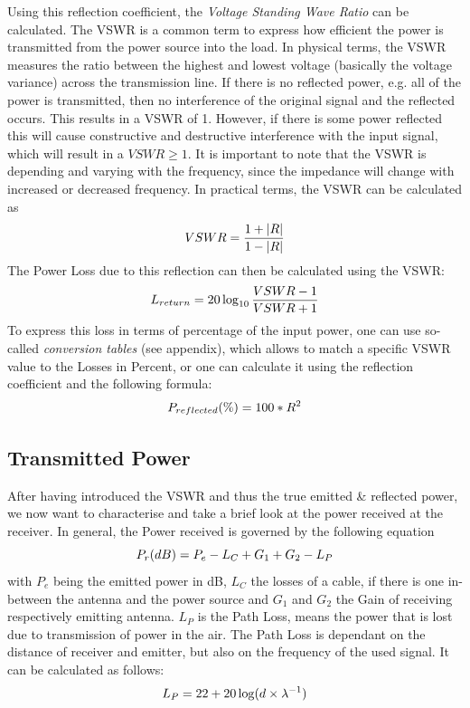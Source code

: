 Using this reflection coefficient, the \textit{Voltage Standing Wave Ratio} can be calculated. The VSWR is a common term to express how efficient the power is transmitted from the power source into the load. In physical terms, the VSWR measures the ratio between the highest and lowest voltage (basically the voltage variance) across the transmission line. If there is no reflected power, e.g. all of the power is transmitted, then no interference of the original signal and the reflected occurs. This results in a VSWR of 1. However, if there is some power reflected this will cause constructive and destructive interference with the input signal, which will result in a $VSWR \geq 1$. It is important to note that the VSWR is depending and varying with the frequency, since the impedance will change with increased or decreased frequency.
In practical terms, the VSWR can be calculated as
\begin{equation}
	\centering
	VSWR = \frac{1 + |R|}{1 - |R|}
\end{equation}
The Power Loss due to this reflection can then be calculated using the VSWR:
\begin{equation}
	\centering
	L_{return} = 20 \log_{10}{\frac{VSWR-1}{VSWR+1}}
\end{equation}
To express this loss in terms of percentage of the input power, one can use so-called \textit{conversion tables} (see appendix), which allows to match a specific VSWR value to the Losses in Percent, or one can calculate it using the reflection coefficient and the following formula:
\begin{equation}
	\centering
	P_{reflected} (\%) = 100 * R^2
\end{equation}

\subsection{Transmitted Power}
\label{subsec:power}
After having introduced the VSWR and thus the true emitted \& reflected power, we now want to characterise and take a brief look at the power received at the receiver. In general, the Power received is governed by the following equation
\begin{equation}
	\centering
	P_r (dB) = P_e - L_C + G_1 + G_2 - L_P
	\label{eq:path}
\end{equation}
with $P_e$ being the emitted power in dB, $L_C$ the losses of a cable, if there is one in-between the antenna and the power source and $G_1$ and $G_2$ the Gain of receiving respectively emitting antenna. $L_P$ is the Path Loss, means the power that is lost due to transmission of power in the air. The Path Loss is dependant on the distance of receiver and emitter, but also on the frequency of the used signal. It can be calculated as follows:
\begin{equation}
	\centering
	L_P = 22 + 20\log(d\times\lambda^{-1})
\end{equation}

